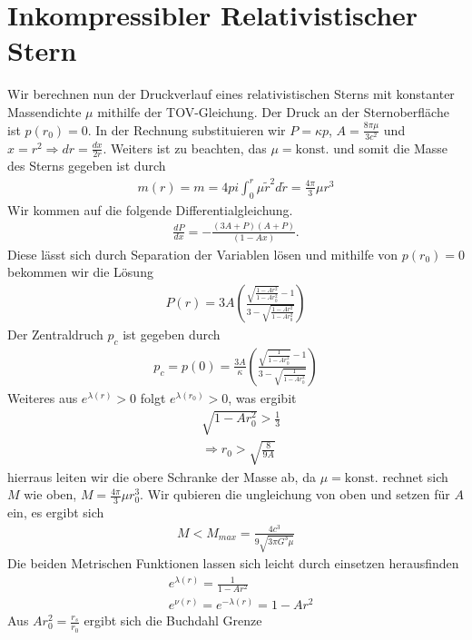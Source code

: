 \documentclass[a4paper]{article}
\begin{document}
\section{Inkompressibler Relativistischer Stern}
Wir berechnen nun der Druckverlauf eines relativistischen Sterns mit
konstanter Massendichte $\mu$ mithilfe der TOV-Gleichung. Der Druck an der
Sternoberfläche ist $p(r_0) =0$. In der Rechnung substituieren wir
$P = \kappa p$, $A = \frac{8\pi\mu}{3c^2}$ und
$x=r^2 \Rightarrow dr= \frac{dx}{2r}$. Weiters ist zu
beachten, das $\mu = \text{konst.}$ und somit
die Masse des Sterns gegeben ist durch
\begin{align}
    m(r) = m = 4pi \int_0^r \mu \tilde{r}^2 d\tilde{r} =\frac{4\pi}{3}\mu r^3
\end{align}
Wir kommen auf die folgende Differentialgleichung.
\begin{align}
    \frac{dP}{dx} = -\frac{(3A+P)(A+P)}{(1-Ax)}.
\end{align}
Diese lässt sich durch Separation der Variablen lösen und mithilfe von
$p(r_0) = 0$ bekommen wir die Lösung
\begin{align}
    P(r) = 3A\left( \frac{\sqrt{\frac{1-Ar^2}{1-Ar_0^2}} -
    1}{3-\sqrt{\frac{1-Ar^2}{1-Ar_0^2}}}\right)
\end{align}
Der Zentraldruch $p_c$ ist gegeben durch
\begin{align}
    p_c = p(0) = \frac{3A}{\kappa}\left( \frac{\sqrt{\frac{1}{1-Ar_0^2}} -
    1}{3-\sqrt{\frac{1}{1-Ar_0^2}}}\right)
\end{align}
Weiteres aus $e^{\lambda(r)} > 0$ folgt $e^{\lambda(r_0)} > 0$, was ergibit
\begin{align}
    &\sqrt{1-Ar_0^2}>\frac{1}{3}\\
    &\Rightarrow r_0 > \sqrt{\frac{8}{9A}}
\end{align}
hierraus leiten wir die obere Schranke der Masse ab, da $\mu=\text{konst.}$
rechnet sich $M$ wie oben, $M = \frac{4\pi}{3} \mu r_0^3$. Wir qubieren die
ungleichung von oben und setzen für $A$ ein, es ergibt sich
\begin{align}
    M < M_{max} = \frac{4c^3}{9\sqrt{3\pi G^3\mu}}
\end{align}
Die beiden Metrischen Funktionen lassen sich leicht durch einsetzen
herausfinden
\begin{align}
    &e^{\lambda(r)} = \frac{1}{1 - Ar^2}\\
    &e^{\nu(r)} = e^{-\lambda(r)} = 1 - Ar^2
\end{align}
Aus $Ar_0^2 = \frac{r_s}{r_0}$ ergibt sich die Buchdahl Grenze
\end{document}
